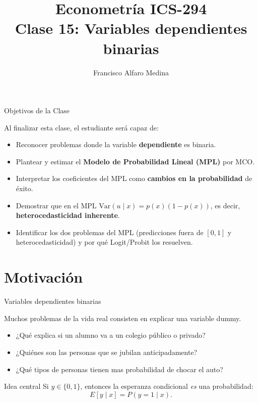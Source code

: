 \documentclass{beamer}
\title[ICS-294]{Econometría ICS-294\\ \small{Clase 15: Variables dependientes binarias }}
\author{Francisco Alfaro Medina}
\institute[USM]{
	Universidad Técnica Federico Santa María\\ %
	\medskip
	\textit{francisco.alfaro@usm.cl} %
}
\date{}
\begin{document}
\begin{frame}
	\titlepage %


\end{frame}
\logo{}

\begin{frame}{Objetivos de la Clase}

Al finalizar esta clase, el estudiante será capaz de:

\begin{itemize}
    \item[\checkmark] Reconocer problemas donde la variable \textbf{dependiente} es binaria.
    \item[\checkmark] Plantear y estimar el \textbf{Modelo de Probabilidad Lineal (MPL)} por MCO.
    \item[\checkmark] Interpretar los coeficientes del MPL como \textbf{cambios en la probabilidad} de éxito.
    \item[\checkmark] Demostrar que en el MPL $\text{Var}(u\mid x)=p(x)(1-p(x))$, es decir, \textbf{heterocedasticidad inherente}.
    \item[\checkmark] Identificar los dos problemas del MPL (predicciones fuera de $[0,1]$ y heterocedasticidad) y por qué Logit/Probit los resuelven.
\end{itemize}

\end{frame}

\section{Motivación}

\begin{frame}{Variables dependientes binarias}

    Muchos problemas de la vida real consisten en explicar una variable dummy.
\begin{itemize}
    \item ¿Qu\'e explica si un alumno va a un colegio p\'ublico o privado?
\item ¿Qui\'enes son las personas que se jubilan anticipadamente?
\item  ¿Qu\'e tipos de personas tienen mas probabilidad de chocar el auto?
\end{itemize}

\pause
\begin{block}{Idea central}
Si $y\in\{0,1\}$, entonces la esperanza condicional \emph{es} una probabilidad:
\[
E[y\mid x] = P(y=1\mid x).
\]
\end{block}

\end{frame}
\end{document}
